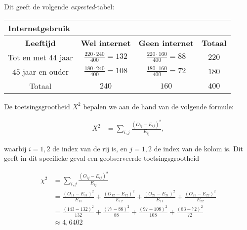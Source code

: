 \begin{enumerate}[label=(\alph*)]
{        Dit geeft de volgende \emph{expected}-tabel:

        \begin{center}
            \renewcommand{\arraystretch}{1.5}
            \begin{tabular}{cccc}
                \multicolumn{4}{l}{Internetgebruik} \\
                \toprule
                    {\bfseries Leeftijd} & {\bfseries Wel internet} & {\bfseries Geen internet} & {\bfseries Totaal} \\
                \cmidrule{1-1} \cmidrule{2-2} \cmidrule{3-3} \cmidrule{4-4}
                    Tot en met $44$ jaar & $\frac{220\cdot 240}{400}=132$ & $\frac{220\cdot 160}{400}=88$ & $220$ \\
                    $45$ jaar en ouder & $\frac{180\cdot 240}{400}=108$ & $\frac{180\cdot 160}{400}=72$ & $180$ \\
                \cmidrule{1-1} \cmidrule{2-2} \cmidrule{3-3} \cmidrule{4-4}
                    Totaal & $240$ & $160$ & $400$ \\
                \bottomrule
            \end{tabular}
        \end{center}

        De toetsingsgrootheid $X^2$ bepalen we aan de hand van de volgende formule:

        \begin{align*}
            X^2  &= \sum_{i,j} \frac{(O_{ij} - E_{ij})^2}{E_{ij}},
        \end{align*}

        waarbij $i = 1,2$ de index van de rij is, en $j = 1,2$ de index van de kolom is.
        Dit geeft in dit specifieke geval een geobserveerde toetsingsgrootheid 
        
        \begin{align*}
            \chi^2  &= \sum_{i,j} \frac{(O_{ij} - E_{ij})^2}{E_{ij}} \\
                    &=\frac{(O_{11} - E_{11})^2}{E_{11}} + \frac{(O_{12} - E_{12})^2}{E_{12}} + \frac{(O_{21} - E_{21})^2}{E_{21}} + \frac{(O_{22} - E_{22})^2}{E_{22}} \\
                    &= \frac{(143 - 132)^2}{132} + \frac{(77 - 88)^2}{88} + \frac{(97 - 108)^2}{108} + \frac{(83-72)^2}{72}\\
                    &\approx 4,6402
        \end{align*}

}
\end{enumerate}
